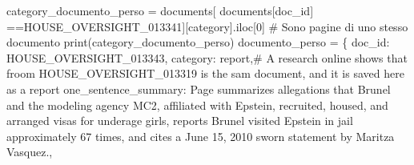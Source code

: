 \documentclass[
  italian,
  a4paper,
]{article}
\newenvironment{Shaded}{\begin{snugshade}}{\end{snugshade}}
\newcommand{\BuiltInTok}[1]{\textcolor[rgb]{0.00,0.23,0.31}{#1}}
\newcommand{\CommentTok}[1]{\textcolor[rgb]{0.37,0.37,0.37}{#1}}
\newcommand{\DecValTok}[1]{\textcolor[rgb]{0.68,0.00,0.00}{#1}}
\newcommand{\NormalTok}[1]{\textcolor[rgb]{0.00,0.23,0.31}{#1}}
\newcommand{\OperatorTok}[1]{\textcolor[rgb]{0.37,0.37,0.37}{#1}}
\newcommand{\StringTok}[1]{\textcolor[rgb]{0.13,0.47,0.30}{#1}}
\begin{document}
\begin{Shaded}
\begin{Highlighting}[]
\NormalTok{category\_documento\_perso }\OperatorTok{=}\NormalTok{ documents[ documents[}\StringTok{\textquotesingle{}doc\_id\textquotesingle{}}\NormalTok{] }\OperatorTok{==}\StringTok{\textquotesingle{}HOUSE\_OVERSIGHT\_013341\textquotesingle{}}\NormalTok{][}\StringTok{\textquotesingle{}category\textquotesingle{}}\NormalTok{].iloc[}\DecValTok{0}\NormalTok{] }\CommentTok{\# Sono pagine di uno stesso documento}
\BuiltInTok{print}\NormalTok{(category\_documento\_perso)}
\NormalTok{documento\_perso }\OperatorTok{=}\NormalTok{ \{}
    \StringTok{\textquotesingle{}doc\_id\textquotesingle{}}\NormalTok{:  }\StringTok{\textquotesingle{}HOUSE\_OVERSIGHT\_013343\textquotesingle{}}\NormalTok{, }
    \StringTok{\textquotesingle{}category\textquotesingle{}}\NormalTok{: }\StringTok{\textquotesingle{}report\textquotesingle{}}\NormalTok{,}\CommentTok{\# A research online shows that froom HOUSE\_OVERSIGHT\_013319 is the sam document, and it is saved here as a report}
    \StringTok{\textquotesingle{}one\_sentence\_summary\textquotesingle{}}\NormalTok{: }\StringTok{\textquotesingle{}Page summarizes allegations that Brunel and the modeling agency MC2, affiliated with Epstein, recruited, housed, and arranged visas for underage girls, reports Brunel visited Epstein in jail approximately 67 times, and cites a June 15, 2010 sworn statement by Maritza Vasquez.\textquotesingle{}}\NormalTok{,}

\end{Highlighting}
\end{Shaded}
\end{document}
